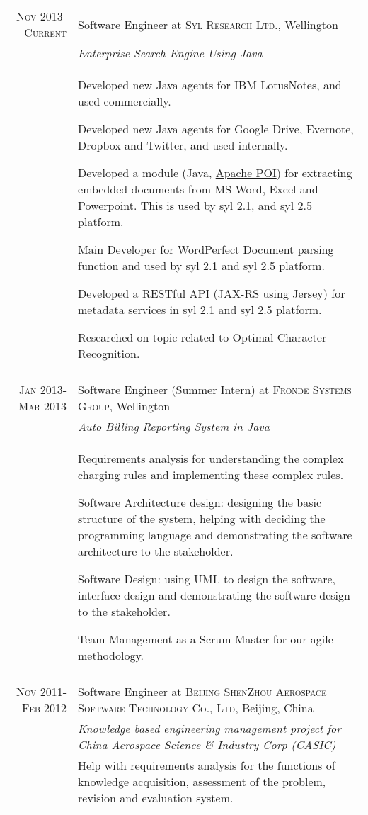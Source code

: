 \documentclass[a4paper,10pt]{article} %
\begin{document}
\begin{tabular}{r|p{11cm}}
\textsc{Nov 2013-Current} & Software Engineer at \textsc{Syl Research Ltd.}, Wellington \\
& \emph{Enterprise Search Engine Using Java}\\ 
& \footnotesize{
Developed new Java agents for IBM LotusNotes, and used commercially. %

Developed new Java agents for Google Drive, Evernote, Dropbox and Twitter, and used internally.

Developed a module (Java,  \href{http://poi.apache.org/}{Apache POI}) for extracting embedded documents from MS Word, Excel and Powerpoint. This is used by syl 2.1, and syl 2.5 platform.

Main Developer for WordPerfect Document parsing function and used by syl 2.1 and syl 2.5 platform.

Developed a RESTful API (JAX-RS using Jersey) for metadata services in syl 2.1 and syl 2.5 platform.

Researched on topic related to Optimal Character Recognition.
}\\
\multicolumn{2}{c}{} \\



\textsc{Jan 2013-Mar 2013} & Software Engineer (Summer Intern) at \textsc{Fronde Systems Group}, Wellington \\
& \emph{Auto Billing Reporting System in Java}\\ 
& \footnotesize{
Requirements analysis for understanding the complex charging rules and implementing these complex rules.

Software Architecture design: designing the basic structure of the system, helping with deciding the programming language and demonstrating the software architecture to the stakeholder.

Software Design: using UML to design the software, interface design and demonstrating the software design to the stakeholder.

Team Management as a Scrum Master for our agile methodology.
}\\
\multicolumn{2}{c}{} \\



\textsc{Nov 2011-Feb 2012} & Software Engineer at \textsc{Beijing ShenZhou Aerospace Software Technology Co., Ltd}, Beijing, China \\
&\emph{Knowledge based engineering management project for China Aerospace Science \& Industry Corp (CASIC)}\\
& \footnotesize{
Help with requirements analysis for the functions of knowledge acquisition, assessment of the problem, revision and evaluation system.

}
\end{tabular}
\end{document}
